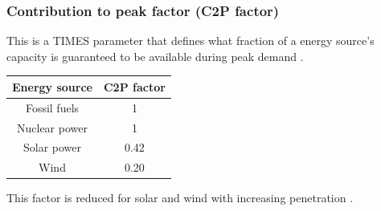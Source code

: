 \begin{frame}
\frametitle{Contribution to peak factor (C2P factor)}
This is a TIMES parameter that defines what fraction of a energy source's capacity is guaranteed to be available during peak demand \cite{loulou_etsap-tiam:_2008}.\\

\begin{tabular}{|c|c|}
\hline 
\textbf{Energy source} & \textbf{C2P factor} \\
\hline 
Fossil fuels & 1 \\
Nuclear power & 1 \\
Solar power & 0.42 \cite{kato_energy_2016}\\
Wind & 0.20 \cite{nguyen_factors_2016}\\
\hline 
\end{tabular}

This factor is reduced for solar and wind with increasing penetration \cite{nguyen_factors_2016}.
\end{frame}